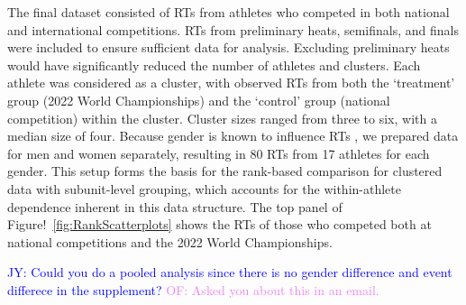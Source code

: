\documentclass[12pt, letterpaper]{article}
\newcommand{\jy}[1]{\textcolor{blue}{JY: #1}}
\newcommand{\of}[1]{\textcolor{violet}{OF: #1}}
\begin{document}
The final dataset consisted of RTs from athletes who competed
in both national and international competitions. RTs from
preliminary heats, semifinals, and finals were included to ensure
sufficient data for analysis. Excluding preliminary heats would have
significantly reduced the number of athletes and clusters. Each
athlete was considered as a cluster, with observed RTs
from both the `treatment' group (2022 World Championships) and
the `control' group (national competition) within the cluster. Cluster
sizes ranged from three to six, with a median size of four. Because gender
is known to influence RTs \citep{babicc2009reaction,
  lipps2011implications}, we prepared data for men and women
separately, resulting in 80 RTs from 17 athletes for each
gender. This setup forms the basis for the rank-based comparison for
clustered data with subunit-level grouping, which accounts for the
within-athlete dependence inherent in this data structure. The top
panel of Figure!~\ref{fig:RankScatterplots} shows the RTs
of those who competed both at national competitions and the 2022 World
Championships.


\jy{Could you do a pooled analysis since there is no gender difference
  and event differece in the supplement?}
\of{Asked you about this in an email.}
\end{document}
